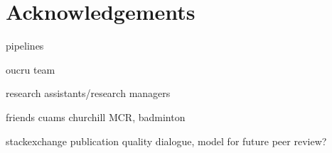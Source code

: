 %
%
\chapter*{Acknowledgements}

pipelines

oucru team

research assistants/research managers

friends
cuams
churchill MCR, badminton

stackexchange
    publication quality dialogue, model for future peer review?


